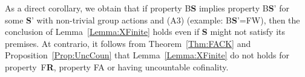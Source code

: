 \documentclass[a4paper]{article}
\theoremstyle{definition}
\newtheorem{rem}[lem]{Remark}
\newcommand*{\category}[1]{\textbf{#1}}
\newcommand*{\CatS}{\category{S}}
\newcommand*{\BS}{B\textbf{S}}
\newcommand*{\FW}{FW}
\newcommand*{\FA}{FA}
\newcommand*{\FR}{F\textbf{R}}
\begin{document}
As a direct corollary, we obtain that if property \BS{} implies property \BS' for some \CatS' with non-trivial group actions and (A3) (example: \BS'=\FW), then the conclusion of Lemma~\ref{Lemma:XFinite} holds even if \CatS{} might not satisfy its premises.
At contrario, it follows from Theorem~\ref{Thm:FACK} and Proposition~\ref{Prop:UncCoun} that Lemma~\ref{Lemma:XFinite} do not holds for property~\FR, property \FA{} or having uncountable cofinality.
%
%
%
%
%
\end{document}
